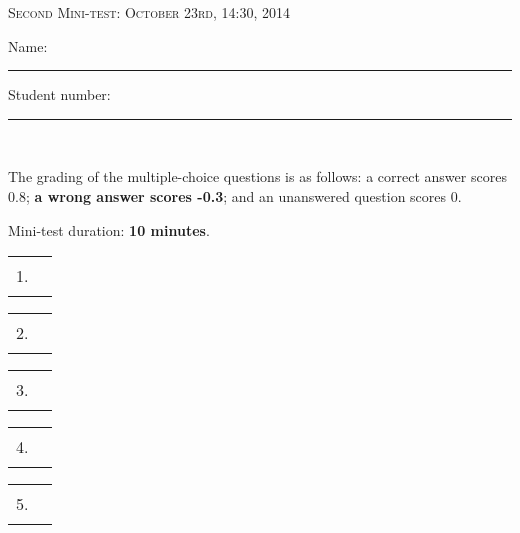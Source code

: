 \documentclass{docist}
\begin{document}
\thispagestyle{empty}

\begin{center}
  {\Large \textsc{Second Mini-test: October 23rd, 14:30, 2014\\[2ex]}}
  {\normalsize    Name: \rule{8cm}{1pt} Student number: \rule{2cm}{1pt}\\[2ex]}
\end{center}

The grading of the multiple-choice questions is as follows: a correct answer scores 0.8; \textbf{a wrong answer scores -0.3}; and an unanswered question scores 0. 

Mini-test duration: \textbf{10 minutes}. 

\begin{center}
%
  \begin{tabular}{rc}
    1. & \rule{1cm}{1pt} \\[2ex]
  \end{tabular}
  \hspace*{0.7cm}
  \begin{tabular}{rc}
    2. & \rule{1cm}{1pt} \\[2ex]
  \end{tabular}
  \hspace*{0.7cm}
  \begin{tabular}{rc}
    3. & \rule{1cm}{1pt} \\[2ex]
  \end{tabular}
  \hspace*{0.7cm}
  \begin{tabular}{rc}
    4. & \rule{1cm}{1pt} \\[2ex]
  \end{tabular}
  \hspace*{0.7cm}
  \begin{tabular}{rc}
    5. & \rule{1cm}{1pt} \\[2ex]
  \end{tabular}
\end{center}



%
%


%
%

\qSeparateEntities

\qChromeUsability

\qGarbageCollector

%
%

\qGraphiteBackend

%
%

\qInteroperabilityScenario

%
%
\end{document}

